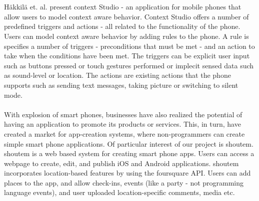 \\\\
Häkkilä et. al. present context Studio - an application for mobile phones that allow users to model context aware behavior. Context Studio offers a number of predefined triggers and actions - all related to the functionality of the phone. Users can model context aware behavior by adding rules to the phone. A rule is specifies a number of triggers - preconditions that must be met - and an action to take when the conditions have been met. The triggers can be explicit user input such as buttons pressed or touch gestures performed or implecit sensed data such as sound-level or location. The actions are existing actions that the phone supports such as sending text messages, taking picture or switching to silent mode.
\\\\ 
With explosion of smart phones, businesses have also realized the potential of having an application to promote its products or services. This, in turn, have created a market for app-creation systems, where non-programmers can create simple smart phone applications. Of particular interest of our project is shoutem. shoutem is a web based system for creating smart phone apps. Users can access a webpage to create, edit, and publish iOS and Android applications. shoutem incorporates location-based features by using the foursquare API. Users can add places to the app, and allow check-ins, events (like a party - not programming language events), and user uploaded location-specific comments, media etc. 
